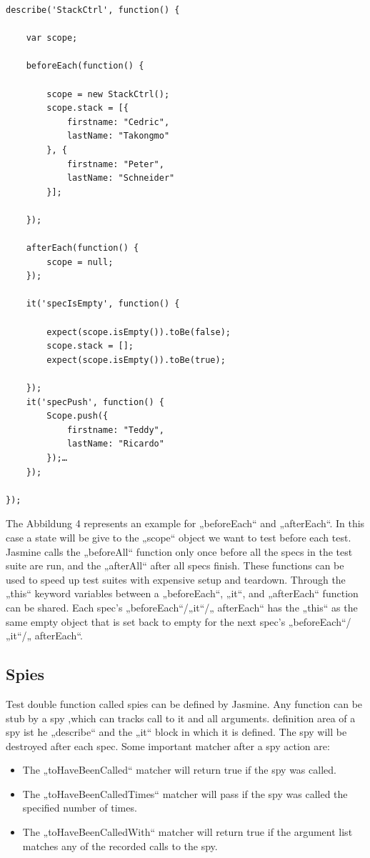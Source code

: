 \documentclass[11pt]{article}
\begin{document}
\pagebreak

\begin{lstlisting}[caption=Setup and Teardown]
describe('StackCtrl', function() {

    var scope;

    beforeEach(function() {

        scope = new StackCtrl();
        scope.stack = [{
            firstname: "Cedric",
            lastName: "Takongmo"
        }, {
            firstname: "Peter",
            lastName: "Schneider"
        }];

    });

    afterEach(function() {
        scope = null;
    });

    it('specIsEmpty', function() {

        expect(scope.isEmpty()).toBe(false);
        scope.stack = [];
        expect(scope.isEmpty()).toBe(true);

    });
    it('specPush', function() {
        Scope.push({
            firstname: "Teddy",
            lastName: "Ricardo"
        });…
    });

});
\end{lstlisting}

The Abbildung 4 represents an example for „beforeEach“ and „afterEach“. In this case a state will be give to the „scope“ object we want to test before each test. Jasmine calls the „beforeAll“ function only once before all the specs in the test suite are run, and the „afterAll“ after all specs finish. These functions can be used to speed up test suites with expensive setup and teardown. Through the „this“ keyword variables between a „beforeEach“, „it“, and „afterEach“ function can be shared. Each spec’s „beforeEach“/„it“/„ afterEach“ has the „this“ as the same empty object that is set back to empty for the next spec’s „beforeEach“/„it“/„ afterEach“.

\subsection{Spies}

Test double function called spies can be defined by Jasmine. Any function can be stub by a spy ,which can tracks call to it and all arguments. definition area of a spy ist he „describe“ and the „it“ block in which it is defined. The spy will be destroyed after each spec. Some important matcher after a spy action are:

\begin{itemize}
\item The „toHaveBeenCalled“ matcher will return true if the spy was called.
\item The „toHaveBeenCalledTimes“ matcher will pass if the spy was called the specified number of times.
\item The „toHaveBeenCalledWith“ matcher will return true if the argument list matches any of the recorded calls to the spy.
\end{itemize}
\end{document}

